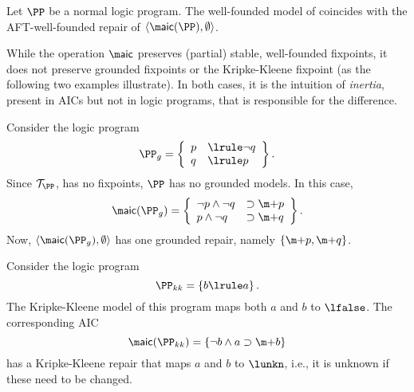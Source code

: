 \begin{corollary}
 Let $\PP$ be a normal logic program. The well-founded model of \PP coincides with the AFT-well-founded repair of $\langle \aicop(\PP),\emptyset\rangle$. 
\end{corollary}

 While the operation $\aicop$ preserves (partial) stable, well-founded  fixpoints, it does not preserve grounded fixpoints or the Kripke-Kleene fixpoint (as the following two examples illustrate). In both cases, it is the intuition of \emph{inertia}, present in AICs but not in logic programs, that is responsible for the difference. 

 
\begin{example}\label{ex:grounded}
  Consider the logic program 
  \[\PP_g = \left\{\begin{array}{ll}p&\lrule \lnot q\\ q&\lrule p \end{array} \right\}.\]
  Since $\mathcal{T}_\PP$, has no fixpoints, $\PP$ has no grounded models. 
  In this case, 
  \[\aicop(\PP_g) = \left\{\begin{array}{ll}\lnot p\land \lnot q &\aicrule \add p \\ p \land  \lnot q &\aicrule \add q\end{array}\right\}.\]
  Now, $\langle \aicop(\PP_g),\emptyset\rangle$ has one grounded repair, namely $\{\add p, \add q\}$. 
\end{example}




\begin{example}
 Consider the logic program
 \[\PP_{kk}=\left\{ b\lrule a\right\}.\]
 The Kripke-Kleene model of this program maps both $a$ and $b$ to $\lfalse$. 
 The corresponding AIC 
 \[\aicop(\PP_{kk}) = \{\lnot b \land a \aicrule \add b\}\] 
 has a Kripke-Kleene repair that maps $a$ and $b$ to $\lunkn$, i.e., it is unknown if these need to be changed. 
\end{example}


